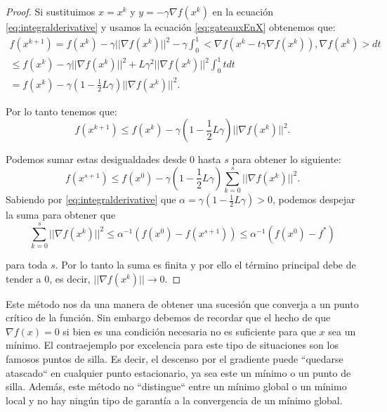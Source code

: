 \begin{proof}
    Si sustituimos $x = x^k$ y $y = -\gamma \nabla f(x^k)$ en la ecuación \eqref{eq:integralderivative} y usamos la ecuación \eqref{eq:gateauxEnX} obtenemos que:
    \begin{equation}
    \begin{split}
        f(x^{k+1})=f(x^k) - \gamma || \nabla f(x^k) ||^2 - \gamma \int_0^1 <\nabla f(x^k -t \gamma \nabla f(x^k)), \nabla f(x^k)>dt \\
        \le f(x^k) - \gamma || \nabla f(x^k) ||^2 + L \gamma^2 || \nabla f(x^k) ||^2 \int_0^1 tdt \\
        = f(x^k) - \gamma (1- \frac{1}{2}L \gamma)|| \nabla f(x^k) ||^2.
    \end{split}
    \end{equation}

    Por lo tanto tenemos que:
    \begin{equation}
        f(x^{k+1}) \le f(x^k) - \gamma (1- \frac{1}{2}L \gamma)|| \nabla f(x^k) ||^2.
    \end{equation}

    Podemos sumar estas desigualdades desde 0 hasta $s$ para obtener lo siguiente:
    \begin{equation}
        f(x^{s+1}) \le f(x^0) - \gamma (1- \frac{1}{2}L \gamma) \sum_{k=0}^s || \nabla f(x^k)||^2.
    \end{equation}
    Sabiendo por \eqref{eq:integralderivative} que $\alpha = \gamma (1- \frac{1}{2}L \gamma) > 0$, podemos despejar la suma para obtener que
    \begin{equation}
        \sum_{k=0}^s || \nabla f(x^k)||^2 \le \alpha^{-1}(f(x^0) - f(x^{s+1})) \le \alpha^{-1}(f(x^0) - f^*)
    \end{equation}

    para toda $s$. Por lo tanto la suma es finita y por ello el término principal debe de tender a 0, es decir, $|| \nabla f(x^k) || \to 0$.
\end{proof}

Este método nos da una manera de obtener una sucesión que converja a un punto crítico de la función. Sin embargo debemos de recordar que el hecho de que $\nabla f(x) = 0$ si bien es una condición necesaria no es suficiente para que $x$ sea un mínimo. El contraejemplo por excelencia para este tipo de situaciones son los famosos puntos de silla. Es decir, el descenso por el gradiente puede ``quedarse atascado`` en cualquier punto estacionario, ya sea este un mínimo o un punto de silla. Además, este método no ``distingue`` entre un mínimo global o un mínimo local y no hay ningún tipo de garantía a la convergencia de un mínimo global.

